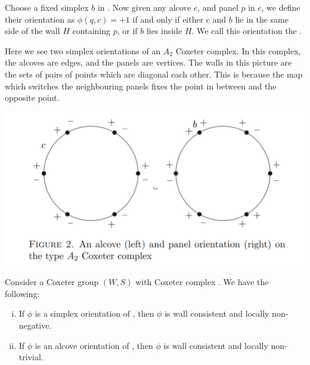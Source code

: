 \documentclass[11pt]{article}
\begin{document}
\begin{definition}
    Choose a fixed simplex $b$ in \sg. Now given any alcove $c$, and panel $p$ in $c$, we define their orientation as $\phi(q,c)=+1$ if and only if either $c$ and $b$ lie in the same side of the wall $H$ containing $p$, or if $b$ lies inside $H$. We call this orientation the .
\end{definition}
\begin{example}
    Here we see two simplex orientations of an $A_2$ Coxeter complex. In this complex, the alcoves are edges, and the panels are vertices. The walls in this picture are the sets of pairs of points which are diagonal each other. This is because the map which switches the neighbouring panels fixes the point in between and the opposite point. 
\end{example}
\begin{center}
\includegraphics[scale=0.5]{Screenshot 2023-02-03 102201.png}\\
\end{center}
\begin{lemma}
    Consider a Coxeter group $(W,S)$ with Coxeter complex \sg. We have the following:
    \begin{enumerate}[(i)]
        \item If $\phi$ is a simplex orientation of \sg, then $\phi$ is wall consistent and locally non-negative.
        \item If $\phi$ is an alcove orientation of \sg, then $\phi$ is wall consistent and locally non-trivial.
    \end{enumerate}
\end{lemma}
\end{document}
